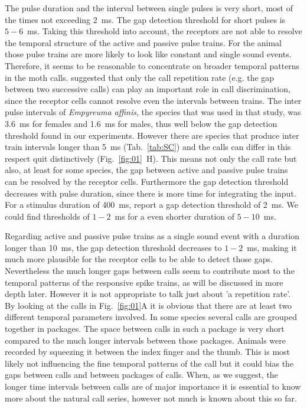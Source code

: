 \documentclass[12pt,a4paper]{article}
\newcommand{\species}[1]{\textit{#1}}
\newcommand{\fig}[2]{(Fig.~#1~#2)}
\begin{document}
The pulse duration and the interval between single pulses is very short, most of the times not exceeding 2~ms. The gap detection threshold for short pulses is $5-6$~ms. Taking this threshold into account, the receptors are not able to resolve the temporal structure of the active and passive pulse trains. For the animal those pulse trains are more likely to look like constant and single sound events. Therefore, it seems to be reasonable to concentrate on broader temporal patterns in the moth calls. \cite{sanderford1998} suggested that only the call repetition rate (e.g. the gap between two successive calls) can play an important role in call discrimination, since the receptor cells cannot resolve even the intervals between trains. The inter pulse intervals of \species{Empyreuma affinis}, the species that was used in that study, was 3.6~ms for females and 1.6~ms for males, thus well below the gap detection threshold found in our experiments. However there are species that produce inter train intervals longer than 5~ms (Tab.~\ref{tab:SC}) and the calls can differ in this respect quit distinctively \fig{\ref{fig:01}}{H}. This means not only the call rate but also, at least for some species, the gap between active and passive pulse trains can be resolved by the receptor cells. Furthermore the gap detection threshold decreases with pulse duration, since there is more time for integrating the input. For a stimulus duration of 400~ms, \cite{surlykke1988} report a gap detection threshold of 2~ms. We could find thresholds of $1-2$~ms for a even shorter duration of $5-10$~ms.

Regarding active and passive pulse trains as a single sound event with a duration longer than 10~ms, the gap detection threshold decreases to $1-2$~ms, making it much more plausible for the receptor cells to be able to detect those gaps. Nevertheless the much longer gaps between calls seem to contribute most to the temporal patterns of the responsive spike trains, as will be discussed in more depth later. However it is not appropriate to talk just about 'a repetition rate'. By looking at the calls in Fig.~\ref{fig:01}{A} it is obvious that there are at least two different temporal parameters involved. In some species several calls are grouped together in packages. The space between calls in such a package is very short compared to the much longer intervals between those packages. Animals were recorded by squeezing it between the index finger and the thumb. This is most likely not influencing the fine temporal patterns of the call but it could bias the gaps between calls and between packages of calls. When, as we suggest, the longer time intervals between calls are of major importance it is essential to know more about the natural call series, however not much is known about this so far.
\end{document}
